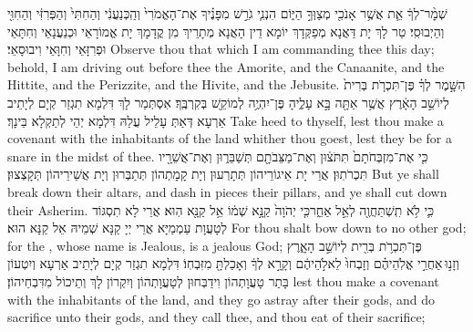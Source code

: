 {שְׁמׇ֨ר־לְךָ֔ אֵ֛ת אֲשֶׁ֥ר אָנֹכִ֖י מְצַוְּךָ֣ הַיּ֑וֹם הִנְנִ֧י גֹרֵ֣שׁ מִפָּנֶ֗יךָ אֶת־הָאֱמֹרִי֙ וְהַֽכְּנַעֲנִ֔י וְהַחִתִּי֙ וְהַפְּרִזִּ֔י וְהַחִוִּ֖י וְהַיְבוּסִֽי׃
}
{טַר לָךְ יָת דַּאֲנָא מְפַקְּדָךְ יוֹמָא דֵין הָאֲנָא מְתָרֵיךְ מִן קֳדָמָךְ יָת אֱמוֹרָאֵי וּכְנַעֲנָאֵי וְחִתָּאֵי וּפְרִזָּאֵי וְחִוָּאֵי וִיבוּסָאֵי׃}
{Observe thou that which I am commanding thee this day; behold, I am driving out before thee the Amorite, and the Canaanite, and the Hittite, and the Perizzite, and the Hivite, and the Jebusite.}{}
{הִשָּׁ֣מֶר לְךָ֗ פֶּן־תִּכְרֹ֤ת בְּרִית֙ לְיוֹשֵׁ֣ב הָאָ֔רֶץ אֲשֶׁ֥ר אַתָּ֖ה בָּ֣א עָלֶ֑יהָ פֶּן־יִהְיֶ֥ה לְמוֹקֵ֖שׁ בְּקִרְבֶּֽךָ׃}
{אִסְתְּמַר לָךְ דִּלְמָא תִגְזַר קְיָם לְיָתֵיב אַרְעָא דְּאַתְּ עָלֵיל עֲלַהּ דִּלְמָא יְהֵי לְתַקְלָא בֵּינָךְ׃}
{Take heed to thyself, lest thou make a covenant with the inhabitants of the land whither thou goest, lest they be for a snare in the midst of thee.}{}
{כִּ֤י אֶת־מִזְבְּחֹתָם֙ תִּתֹּצ֔וּן וְאֶת־מַצֵּבֹתָ֖ם תְּשַׁבֵּר֑וּן וְאֶת־אֲשֵׁרָ֖יו תִּכְרֹתֽוּן׃
}
{אֲרֵי יָת אֵיגוֹרֵיהוֹן תְּתָרְעוּן וְיָת קָמָתְהוֹן תְּתַבְּרוּן וְיָת אֲשֵׁירֵיהוֹן תְּקָצְצוּן׃}
{But ye shall break down their altars, and dash in pieces their pillars, and ye shall cut down their Asherim.}{}
{כִּ֛י לֹ֥א תִֽשְׁתַּחֲוֶ֖ה לְאֵ֣ל אַחֵ֑\large ר\normalsize  כִּ֤י יְהֹוָה֙ קַנָּ֣א שְׁמ֔וֹ אֵ֥ל קַנָּ֖א הֽוּא׃
}
{אֲרֵי לָא תִסְגּוֹד לְטָעֲוָת עַמְמַיָּא אֲרֵי יְיָ קַנָּא שְׁמֵיהּ אֵל קַנָּא הוּא׃}
{For thou shalt bow down to no other god; for the \lord, whose name is Jealous, is a jealous God;}{}
{פֶּן־תִּכְרֹ֥ת בְּרִ֖ית לְיוֹשֵׁ֣ב הָאָ֑רֶץ וְזָנ֣וּ \legarmeh  אַחֲרֵ֣י אֱלֹֽהֵיהֶ֗ם וְזָבְחוּ֙ לֵאלֹ֣הֵיהֶ֔ם וְקָרָ֣א לְךָ֔ וְאָכַלְתָּ֖ מִזִּבְחֽוֹ׃
}
{דִּלְמָא תִגְזַר קְיָם לְיָתֵיב אַרְעָא וְיִטְעוֹן בָּתַר טָעֲוָתְהוֹן וִידַבְּחוּן לְטָעֲוָתְהוֹן וְיִקְרוֹן לָךְ וְתֵיכוֹל מִדִּבְחֵיהוֹן׃}
{lest thou make a covenant with the inhabitants of the land, and they go astray after their gods, and do sacrifice unto their gods, and they call thee, and thou eat of their sacrifice;}{}
